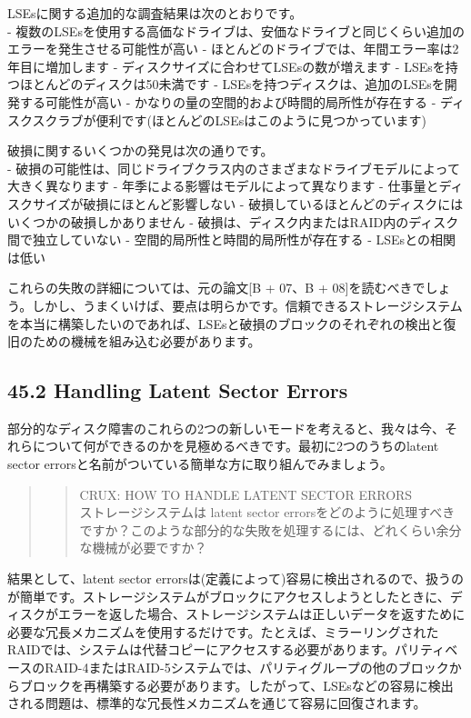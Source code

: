 LSEsに関する追加的な調査結果は次のとおりです。\\
-
複数のLSEsを使用する高価なドライブは、安価なドライブと同じくらい追加のエラーを発生させる可能性が高い
- ほとんどのドライブでは、年間エラー率は2年目に増加します -
ディスクサイズに合わせてLSEsの数が増えます -
LSEsを持つほとんどのディスクは50未満です -
LSEsを持つディスクは、追加のLSEsを開発する可能性が高い -
かなりの量の空間的および時間的局所性が存在する -
ディスクスクラブが便利です(ほとんどのLSEsはこのように見つかっています)

破損に関するいくつかの発見は次の通りです。\\
-
破損の可能性は、同じドライブクラス内のさまざまなドライブモデルによって大きく異なります
- 年季による影響はモデルによって異なります -
仕事量とディスクサイズが破損にほとんど影響しない -
破損しているほとんどのディスクにはいくつかの破損しかありません -
破損は、ディスク内またはRAID内のディスク間で独立していない -
空間的局所性と時間的局所性が存在する - LSEsとの相関は低い

これらの失敗の詳細については、元の論文{[}B + 07、B +
08{]}を読むべきでしょう。しかし、うまくいけば、要点は明らかです。信頼できるストレージシステムを本当に構築したいのであれば、LSEsと破損のブロックのそれぞれの検出と復旧のための機械を組み込む必要があります。

\hypertarget{handling-latent-sector-errors}{%
\subsection*{45.2 Handling Latent Sector
Errors}\label{handling-latent-sector-errors}}

部分的なディスク障害のこれらの2つの新しいモードを考えると、我々は今、それらについて何ができるのかを見極めるべきです。最初に2つのうちのlatent
sector errorsと名前がついている簡単な方に取り組んでみましょう。

\begin{quote}
\begin{quote}
CRUX: HOW TO HANDLE LATENT SECTOR ERRORS\\
ストレージシステムは latent sector
errorsをどのように処理すべきですか？このような部分的な失敗を処理するには、どれくらい余分な機械が必要ですか？
\end{quote}
\end{quote}

結果として、latent sector
errorsは(定義によって)容易に検出されるので、扱うのが簡単です。ストレージシステムがブロックにアクセスしようとしたときに、ディスクがエラーを返した場合、ストレージシステムは正しいデータを返すために必要な冗長メカニズムを使用するだけです。たとえば、ミラーリングされたRAIDでは、システムは代替コピーにアクセスする必要があります。パリティベースのRAID-4またはRAID-5システムでは、パリティグループの他のブロックからブロックを再構築する必要があります。したがって、LSEsなどの容易に検出される問題は、標準的な冗長性メカニズムを通じて容易に回復されます。

